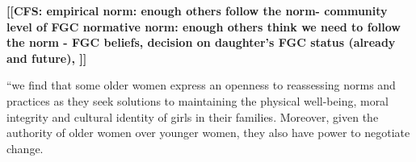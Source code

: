 \documentclass[12pt,]{article}
\newcommand{\comment}[1]{\textbf{[[#1]]}}
\newcommand{\cfcmt}[1]{\comment{CFS: #1}}
\begin{document}

 
\cfcmt{empirical norm:  enough others follow the norm-  community level of FGC \cite{Bicc10} normative norm:  enough others think we need to follow the norm -  FGC beliefs, decision on daughter's FGC status (already and future), \cite{Bicc10}}

“we find that some older women express an openness to reassessing norms and practices as they seek solutions to maintaining the physical well-being, moral integrity and cultural identity of girls in their families. Moreover, given the authority of older women over younger women, they also have power to negotiate change.\cite{ShelMore18}




\end{document}
